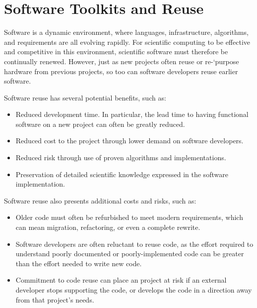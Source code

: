 

\section{Software Toolkits and Reuse}
\label{CpFI4:sec:reuse}

Software is a dynamic environment, where languages, infrastructure,
algorithms, and requirements are all evolving rapidly.
For scientific computing to be effective and competitive in this environment,
scientific software must therefore be continually renewed.
However, just as new projects often reuse or re-`purpose hardware
from previous projects, so too can software
developers reuse earlier software. 

 Software reuse has several potential benefits, such as:
\begin{itemize}
\item Reduced development time.  In particular, the lead time to having
functional software on a new project can often be greatly reduced.
\item Reduced cost to the project through lower demand on software developers.
\item Reduced risk through use of proven algorithms and implementations.
\item Preservation of detailed scientific knowledge expressed in the software implementation.
\end{itemize}
Software reuse also presents additional costs and risks, such as:
\begin{itemize}
\item Older code must often be refurbished to meet modern requirements,
which can mean migration, refactoring, or even a complete rewrite.
\item Software developers are often reluctant to reuse code,
as the effort required to understand poorly documented or
poorly-implemented code can be greater than the effort needed to write new code.
\item Commitment to code reuse can place an project at risk
if an external developer stops supporting the code, or develops the
code in a direction away from that project's needs.
\end{itemize}

